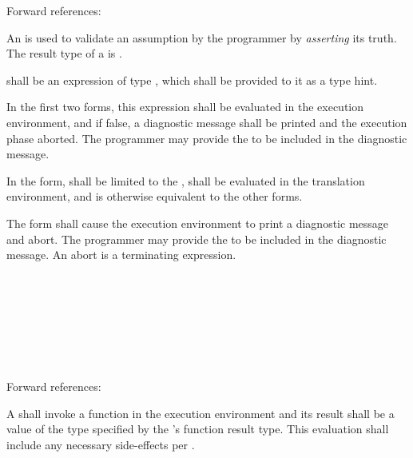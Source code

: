 Forward references: 

\specsubsubitem
An  is used to validate an assumption by the
programmer by \textit{asserting} its truth. The result type of a
 is .

\specsubsubitem
{} shall be an expression of type , which
shall be provided to it as a type hint.

\specsubsubitem
In the first two forms, this expression shall be evaluated
in the execution environment, and if false, a diagnostic message shall be
printed and the execution phase aborted. The programmer may provide the
 to be included in the diagnostic message.

\specsubsubitem
In the  form,  shall be limited to the
, shall be evaluated in the
translation environment, and is otherwise equivalent to the other forms.

\specsubsubitem
The  form shall cause the execution environment to print a
diagnostic message and abort. The programmer may provide the
 to be included in the diagnostic message. An
abort is a terminating expression.


\begin{grammar}
 \\
	 \terminal{(}  \terminal{)} \\

 \\
	 \optional{\terminal{,}} \\
	  \optional{\terminal{,}} \\
	 \terminal{,}  \\
\end{grammar}

Forward references: 

\specsubsubitem
A  shall invoke a function in the execution
environment and its result shall be a value of the type specified by the
's function result type. This evaluation shall
include any necessary side-effects per .


